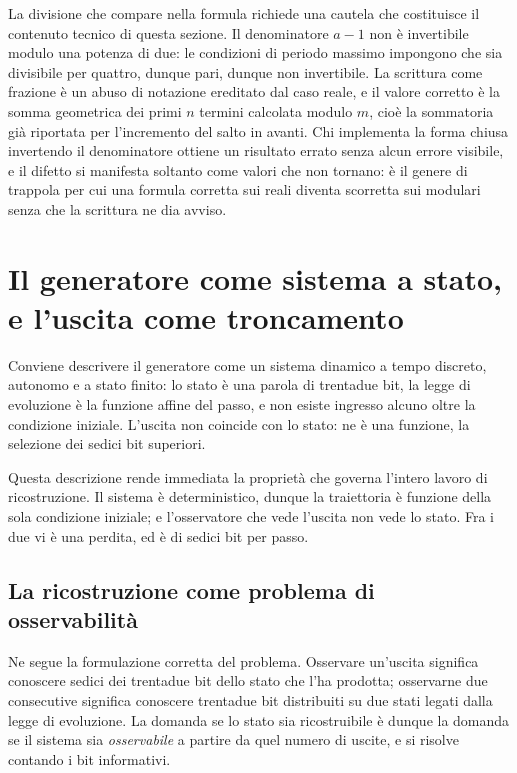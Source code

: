 La divisione che compare nella formula richiede una cautela che costituisce il contenuto tecnico di questa sezione. Il denominatore $a-1$ non è invertibile modulo una potenza di due: le condizioni di periodo massimo impongono che sia divisibile per quattro, dunque pari, dunque non invertibile. La scrittura come frazione è un abuso di notazione ereditato dal caso reale, e il valore corretto è la somma geometrica dei primi $n$ termini calcolata modulo $m$, cioè la sommatoria già riportata per l'incremento del salto in avanti. Chi implementa la forma chiusa invertendo il denominatore ottiene un risultato errato senza alcun errore visibile, e il difetto si manifesta soltanto come valori che non tornano: è il genere di trappola per cui una formula corretta sui reali diventa scorretta sui modulari senza che la scrittura ne dia avviso.

\section{Il generatore come sistema a stato, e l'uscita come troncamento}

Conviene descrivere il generatore come un sistema dinamico a tempo discreto, autonomo e a stato finito: lo stato è una parola di trentadue bit, la legge di evoluzione è la funzione affine del passo, e non esiste ingresso alcuno oltre la condizione iniziale. L'uscita non coincide con lo stato: ne è una funzione, la selezione dei sedici bit superiori.

Questa descrizione rende immediata la proprietà che governa l'intero lavoro di ricostruzione. Il sistema è deterministico, dunque la traiettoria è funzione della sola condizione iniziale; e l'osservatore che vede l'uscita non vede lo stato. Fra i due vi è una perdita, ed è di sedici bit per passo.

\subsection*{La ricostruzione come problema di osservabilità}

Ne segue la formulazione corretta del problema. Osservare un'uscita significa conoscere sedici dei trentadue bit dello stato che l'ha prodotta; osservarne due consecutive significa conoscere trentadue bit distribuiti su due stati legati dalla legge di evoluzione. La domanda se lo stato sia ricostruibile è dunque la domanda se il sistema sia \emph{osservabile} a partire da quel numero di uscite, e si risolve contando i bit informativi.

